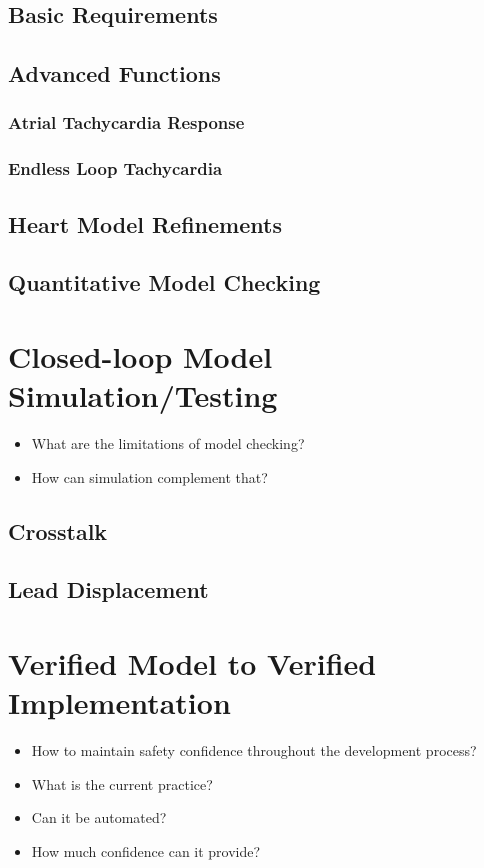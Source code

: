 \documentclass[openany]{now} %
\begin{document}
\section{Basic Requirements}
\section{Advanced Functions}
\subsection{Atrial Tachycardia Response}
\subsection{Endless Loop Tachycardia}
\section{Heart Model Refinements}
    
\section{Quantitative Model Checking}

\chapter{Closed-loop Model Simulation/Testing}
\begin{itemize}
	\item What are the limitations of model checking?
    \item How can simulation complement that?
\end{itemize}

\section{Crosstalk}

\section{Lead Displacement}

\chapter{Verified Model to Verified Implementation}
\begin{itemize}
        
            \item How to maintain safety confidence throughout the development process? 
            \item What is the current practice?
            \item Can it be automated?
            \item How much confidence can it provide?
\end{itemize}
\end{document}
